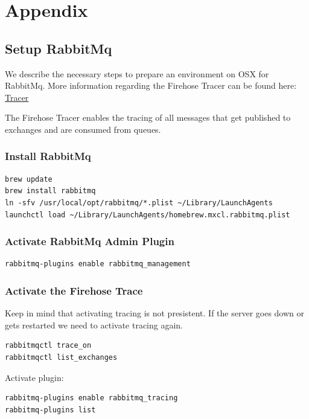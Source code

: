 \documentclass[captions=tableheading]{scrreprt}
\begin{document}
\chapter{Appendix}
\label{sec:orgheadline31}
\section{Setup RabbitMq}
\label{sec:orgheadline18}
We describe the necessary steps to prepare an environment on OSX for
RabbitMq. More information regarding the Firehose Tracer can be found
here: \href{https://www.rabbitmq.com/firehose.html}{Tracer}

The Firehose Tracer enables the tracing of all messages that get
published to exchanges and are consumed from queues.

\subsection{Install RabbitMq}
\label{sec:orgheadline24}
\begin{verbatim}
brew update
brew install rabbitmq
ln -sfv /usr/local/opt/rabbitmq/*.plist ~/Library/LaunchAgents
launchctl load ~/Library/LaunchAgents/homebrew.mxcl.rabbitmq.plist
\end{verbatim}

\subsection{Activate RabbitMq Admin Plugin}
\label{sec:orgheadline25}
\begin{verbatim}
rabbitmq-plugins enable rabbitmq_management
\end{verbatim}

\subsection{Activate the Firehose Trace}
\label{sec:orgheadline26}
Keep in mind that activating tracing is not presistent. If the server
goes down or gets restarted we need to activate tracing again.

\begin{verbatim}
rabbitmqctl trace_on
rabbitmqctl list_exchanges
\end{verbatim}

Activate plugin:
\begin{verbatim}
rabbitmq-plugins enable rabbitmq_tracing
rabbitmq-plugins list
\end{verbatim}
\end{document}
